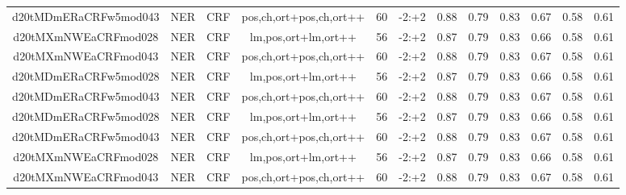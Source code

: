 \documentclass[a4paper]{article}
\begin{document}
\begin{landscape}
\begin{center}
\begin{tabular}{ |c|c|c|c|c|c|c|c|c|c|c|c|}
 
 	
 	\small{ d20tMDmERaCRFw5mod043 } & \small{ NER} & \small{  CRF }  & pos,ch,ort+pos,ch,ort++  &  60 &  \small{  -2:+2 }  &  0.88 & 0.79 & 0.83  &  0.67 & 0.58 & 0.61 \\
 	

 
 	
 	\small{ d20tMXmNWEaCRFmod028 } & \small{ NER} & \small{  CRF }  & lm,pos,ort+lm,ort++  &  56 &  \small{  -2:+2 }  &  0.87 & 0.79 & 0.83  &  0.66 & 0.58 & 0.61 \\
 	

 
 	
 	\small{ d20tMXmNWEaCRFmod043 } & \small{ NER} & \small{  CRF }  & pos,ch,ort+pos,ch,ort++  &  60 &  \small{  -2:+2 }  &  0.88 & 0.79 & 0.83  &  0.67 & 0.58 & 0.61 \\
 	

 
 	
 	\small{ d20tMDmERaCRFw5mod028 } & \small{ NER} & \small{  CRF }  & lm,pos,ort+lm,ort++  &  56 &  \small{  -2:+2 }  &  0.87 & 0.79 & 0.83  &  0.66 & 0.58 & 0.61 \\
 	

 
 	
 	\small{ d20tMDmERaCRFw5mod043 } & \small{ NER} & \small{  CRF }  & pos,ch,ort+pos,ch,ort++  &  60 &  \small{  -2:+2 }  &  0.88 & 0.79 & 0.83  &  0.67 & 0.58 & 0.61 \\
 	

 
 	
 	\small{ d20tMDmERaCRFw5mod028 } & \small{ NER} & \small{  CRF }  & lm,pos,ort+lm,ort++  &  56 &  \small{  -2:+2 }  &  0.87 & 0.79 & 0.83  &  0.66 & 0.58 & 0.61 \\
 	

 
 	
 	\small{ d20tMDmERaCRFw5mod043 } & \small{ NER} & \small{  CRF }  & pos,ch,ort+pos,ch,ort++  &  60 &  \small{  -2:+2 }  &  0.88 & 0.79 & 0.83  &  0.67 & 0.58 & 0.61 \\
 	

 
 	
 	\small{ d20tMXmNWEaCRFmod028 } & \small{ NER} & \small{  CRF }  & lm,pos,ort+lm,ort++  &  56 &  \small{  -2:+2 }  &  0.87 & 0.79 & 0.83  &  0.66 & 0.58 & 0.61 \\
 	

 
 	
 	\small{ d20tMXmNWEaCRFmod043 } & \small{ NER} & \small{  CRF }  & pos,ch,ort+pos,ch,ort++  &  60 &  \small{  -2:+2 }  &  0.88 & 0.79 & 0.83  &  0.67 & 0.58 & 0.61 \\
 	


\end{tabular}
\end{center}
\end{landscape}
\end{document}

